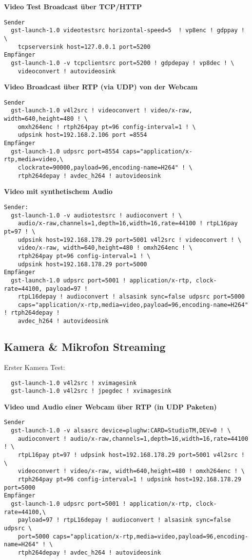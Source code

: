 \textbf{Video Test Broadcast über TCP/HTTP}
\begin{verbatim}
Sender
  gst-launch-1.0 videotestsrc horizontal-speed=5  ! vp8enc ! gdppay ! \
    tcpserversink host=127.0.0.1 port=5200
Empfänger
  gst-launch-1.0 -v tcpclientsrc port=5200 ! gdpdepay ! vp8dec ! \
    videoconvert ! autovideosink
\end{verbatim}

\textbf{Video Broadcast über RTP (via UDP) von der Webcam}
\begin{verbatim}
Sender
  gst-launch-1.0 v4l2src ! videoconvert ! video/x-raw, width=640,height=480 ! \
    omxh264enc ! rtph264pay pt=96 config-interval=1 ! \
    udpsink host=192.168.2.106 port =8554
Empfänger
  gst-launch-1.0 udpsrc port=8554 caps="application/x-rtp,media=video,\
    clockrate=90000,payload=96,encoding-name=H264" ! \
    rtph264depay ! avdec_h264 ! autovideosink
\end{verbatim}

\textbf{Video mit synthetischem Audio}
\begin{verbatim}
Sender:
  gst-launch-1.0 -v audiotestsrc ! audioconvert ! \
    audio/x-raw,channels=1,depth=16,width=16,rate=44100 ! rtpL16pay pt=97 ! \
    udpsink host=192.168.178.29 port=5001 v4l2src ! videoconvert ! \
    video/x-raw, width=640,height=480 ! omxh264enc ! \
    rtph264pay pt=96 config-interval=1 ! \
    udpsink host=192.168.178.29 port=5000
Empfänger
  gst-launch-1.0 udpsrc port=5001 ! application/x-rtp, clock-rate=44100, payload=97 ! 
    rtpL16depay ! audioconvert ! alsasink sync=false udpsrc port=5000 
    caps="application/x-rtp,media=video,payload=96,encoding-name=H264" ! rtph264depay !     
    avdec_h264 ! autovideosink
\end{verbatim}

\subsection{Kamera \& Mikrofon Streaming}
Erster Kamera Test:
\begin{verbatim}
  gst-launch-1.0 v4l2src ! xvimagesink
  gst-launch-1.0 v4l2src ! jpegdec ! xvimagesink
\end{verbatim}

\textbf{Video und Audio einer Webcam über RTP (in UDP Paketen)}
\begin{verbatim}
Sender
  gst-launch-1.0 -v alsasrc device=plughw:CARD=StudioTM,DEV=0 ! \
    audioconvert ! audio/x-raw,channels=1,depth=16,width=16,rate=44100 ! \
    rtpL16pay pt=97 ! udpsink host=192.168.178.29 port=5001 v4l2src ! \
    videoconvert ! video/x-raw, width=640,height=480 ! omxh264enc ! \
    rtph264pay pt=96 config-interval=1 ! udpsink host=192.168.178.29 port=5000
Empfänger
  gst-launch-1.0 udpsrc port=5001 ! application/x-rtp, clock-rate=44100,\
    payload=97 ! rtpL16depay ! audioconvert ! alsasink sync=false udpsrc \
    port=5000 caps="application/x-rtp,media=video,payload=96,encoding-name=H264" ! \
    rtph264depay ! avdec_h264 ! autovideosink
\end{verbatim}

